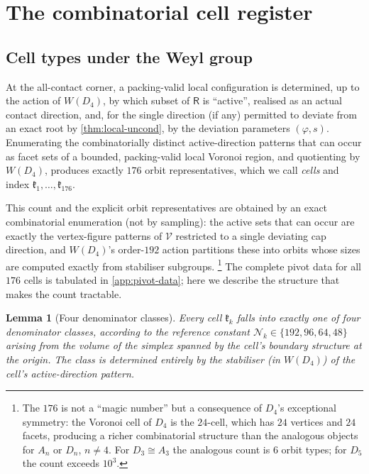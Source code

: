 \documentclass[11pt,reqno]{amsart}
\renewcommand{\_}{\origunderscore\allowbreak}
\numberwithin{equation}{section}
\theoremstyle{plain}
\newtheorem{lem}[thm]{Lemma}
\theoremstyle{definition}
\theoremstyle{remark}
\newcommand{\Rt}{\mathsf{R}}                 %
\newcommand{\VCell}{\mathcal{V}}             %
\newcommand{\Cell}[1]{\mathfrak{k}_{#1}}     %
\newcommand{\tilt}{\varphi}                  %
\newcommand{\arcp}{s}                        %
\newcommand{\norm}[1]{\mathcal{N}_{#1}}      %
\begin{document}
\section{The combinatorial cell register}\label{sec:chamber-register}

\subsection{Cell types under the Weyl group}

At the all-contact corner, a packing-valid local configuration is
determined, up to the action of $W(D_4)$, by which subset of $\Rt$ is
``active'', realised as an actual contact direction, and, for the
single direction (if any) permitted to deviate from an exact root by
\cref{thm:local-uncond}, by the deviation parameters $(\tilt,\arcp)$.
Enumerating the combinatorially distinct active-direction patterns that
can occur as facet sets of a bounded, packing-valid local Voronoi
region, and quotienting by $W(D_4)$, produces exactly $176$ orbit
representatives, which we call \emph{cells} and index
$\Cell1,\dots,\Cell{176}$.

This count and the explicit orbit representatives are obtained by an
exact combinatorial enumeration (not by sampling): the active sets that
can occur are exactly the vertex-figure patterns of $\VCell$ restricted
to a single deviating cap direction, and $W(D_4)$'s order-$192$ action
partitions these into orbits whose sizes are computed exactly from
stabiliser subgroups.%
\footnote{The $176$ is not a ``magic number'' but a consequence of $D_4$'s
  exceptional symmetry: the Voronoi cell of $D_4$ is the $24$-cell, which has
  $24$ vertices and $24$ facets, producing a richer combinatorial structure
  than the analogous objects for $A_n$ or $D_n$, $n\ne4$.  For $D_3\cong A_3$
  the analogous count is $6$ orbit types; for $D_5$ the count exceeds $10^3$.}
The complete pivot data for all $176$ cells is
tabulated in \cref{app:pivot-data}; here we describe the structure that
makes the count tractable.

\begin{lem}[Four denominator classes]\label{lem:denom-classes-new}
Every cell $\Cell{k}$ falls into exactly one of four \emph{denominator
classes}, according to the reference constant $\norm{k}\in
\{192,96,64,48\}$ arising from the volume of the simplex spanned by the
cell's boundary structure at the origin. The class is determined
entirely by the stabiliser (in $W(D_4)$) of the cell's active-direction
pattern.
\end{lem}
\end{document}
